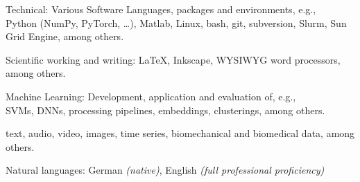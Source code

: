 \inlineheadsection
{Technical:}
{
    Various Software Languages, packages and environments, e.g.,\\
    Python (NumPy, PyTorch, \dots), Matlab, Linux, bash, git, subversion, Slurm, Sun Grid Engine, among others.
}

\vstep
\inlineheadsection
{Scientific working and writing:}
{
        LaTeX, Inkscape, WYSIWYG word processors, among others.
}

\vstep
\inlineheadsection
{Machine Learning:}
{
        Development, application and evaluation of, e.g.,\\
        SVMs, DNNs, processing pipelines, embeddings, clusterings, among others.
}

\vstep
{}
{
       text, audio, video, images, time series, biomechanical and biomedical data, among others.
}



\vstep
\inlineheadsection %
{Natural languages:}
{
    German \textit{(native)}, English \textit{(full professional proficiency)}
}


